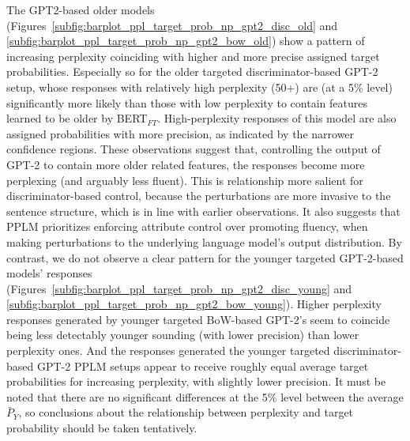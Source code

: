 The GPT2-based older models (Figures~\ref{subfig:barplot_ppl_target_prob_np_gpt2_disc_old} and \ref{subfig:barplot_ppl_target_prob_np_gpt2_bow_old}) show a pattern of increasing perplexity coinciding with higher and more precise assigned target probabilities. Especially so for the older targeted discriminator-based GPT-2 setup, whose responses with relatively high perplexity (50+) are (at a 5\% level) significantly more likely than those with low perplexity to contain features learned to be older by BERT$_{FT}$. High-perplexity responses of this model are also assigned probabilities with more precision, as indicated by the narrower confidence regions. These observations suggest that, controlling the output of GPT-2 to contain more older related features, the responses become more perplexing (and arguably less fluent). This is relationship more salient for discriminator-based control, because the perturbations are more invasive to the sentence structure, which is in line with earlier observations. It also suggests that PPLM prioritizes enforcing attribute control over promoting fluency, when making perturbations to the underlying language model's output distribution.  
By contrast, we do not observe a clear pattern for the younger targeted GPT-2-based models' responses (Figures~\ref{subfig:barplot_ppl_target_prob_np_gpt2_disc_young} and \ref{subfig:barplot_ppl_target_prob_np_gpt2_bow_young}). Higher perplexity responses generated by younger targeted BoW-based GPT-2's seem to coincide being less detectably younger sounding (with lower precision) than lower perplexity ones. And the responses generated the younger targeted discriminator-based GPT-2 PPLM setups appear to receive roughly equal average target probabilities for increasing perplexity, with slightly lower precision. It must be noted that there are no significant differences at the 5\% level between the average $\bar{P}_Y$, so conclusions about the relationship between perplexity and target probability should be taken tentatively.


